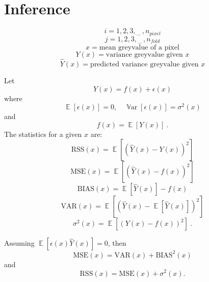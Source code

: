 \documentclass[12pt, a4paper]{memoir}
\DeclareMathOperator{\expectation}{\mathbb{E}}
\DeclareMathOperator{\variance}{\mathbb{V}ar}
\newcommand{\dotdotdot}{_{\phantom{.}\cdots}}
\begin{document}
\chapter{Inference}
\begin{equation*}
i=1,2,3,\dotdotdot,n_{pixel}
\end{equation*}
\begin{equation*}
j=1,2,3,\dotdotdot,n_{fold}
\end{equation*}
\begin{equation*}
x = \text{mean greyvalue of a pixel}
\end{equation*}
\begin{equation*}
Y(x)= \text{variance greyvalue given }x
\end{equation*}
\begin{equation*}
\widehat{Y}(x) = \text{predicted variance greyvalue given }x
\end{equation*}

Let
\begin{equation}
Y(x) = f(x) + \epsilon(x)
\end{equation}
where
\begin{equation}
\expectation[\epsilon(x)] = 0, \quad \variance[\epsilon(x)] = \sigma^2(x)
\end{equation}
and
\begin{equation}
f(x) = \expectation\left[Y(x)\right] \ .
\end{equation}
The statistics for a given $x$ are:
\begin{equation}
\text{RSS}(x) = \expectation\left[
\left(\widehat{Y}(x) - Y(x)\right)^2
\right]
\end{equation}
\begin{equation}
\text{MSE}(x) = \expectation\left[
\left(\widehat{Y}(x)-f(x)\right)^2
\right]
\end{equation}
\begin{equation}
\text{BIAS}(x) = 
\expectation\left[\widehat{Y}(x)\right] - f(x)
\end{equation}
\begin{equation}
\text{VAR}(x) = \expectation\left[
\left(\widehat{Y}(x) - \expectation\left[\widehat{Y}(x)\right]\right)^2
\right]
\end{equation}
\begin{equation}
\sigma^2(x) = \expectation\left[
\left(Y(x) - f(x)\right)^2
\right] \ .
\end{equation}

Assuming $\expectation\left[\epsilon(x)\widehat{Y}(x)\right] = 0$, then
\begin{equation}
\text{MSE}(x) = \text{VAR}(x) + \text{BIAS}^2(x)
\end{equation}
and
\begin{equation}
\text{RSS}(x) = \text{MSE}(x) + \sigma^2(x)  .
\end{equation}
\end{document}
